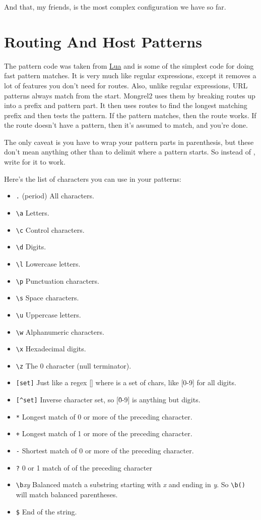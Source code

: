 And that, my friends, is the most complex configuration we have so far.


\section{Routing And Host Patterns}

The pattern code was taken from \href{http://www.lua.org/}{Lua} and is some of
the simplest code for doing fast pattern matches.  It is very much like regular
expressions, except it removes a lot of features you don't need for routes.
Also, unlike regular expressions, URL patterns always match from the start.
Mongrel2 uses them by breaking routes up into a prefix and pattern part.  It
then uses routes to find the longest matching prefix and then tests the
pattern.  If the pattern matches, then the route works.  If the route doesn't
have a pattern, then it's assumed to match, and you're done.

The only caveat is you have to wrap your pattern parts in parenthesis, but these don't mean anything
other than to delimit where a pattern starts.  So instead of , write 
for it to work.

Here's the list of characters you can use in your patterns:

\begin{itemize}
\item \verb|.| (period) All characters.
\item \verb|\a| Letters.
\item \verb|\c| Control characters.
\item \verb|\d| Digits.
\item \verb|\l| Lowercase letters.
\item \verb|\p| Punctuation characters.
\item \verb|\s| Space characters.
\item \verb|\u| Uppercase letters.
\item \verb|\w| Alphanumeric characters.
\item \verb|\x| Hexadecimal digits.
\item \verb|\z| The 0 character (null terminator).
\item \verb|[set]| Just like a regex [] where is a set of chars, like [0-9] for all digits.
\item \verb|[^set]| Inverse character set, so [\^0-9] is anything but digits.
\item \verb|*| Longest match of 0 or more of the preceding character.
\item \verb|+| Longest match of 1 or more of the preceding character.
\item \verb|-| Shortest match of 0 or more of the preceding character.
\item \verb|?| 0 or 1 match of of the preceding character
\item \verb|\b|\emph{xy} Balanced match a substring starting with \emph{x}
  and ending in \emph{y}.  So \verb|\b()| will match balanced parentheses.
\item \verb|$| End of the string.
\end{itemize}

